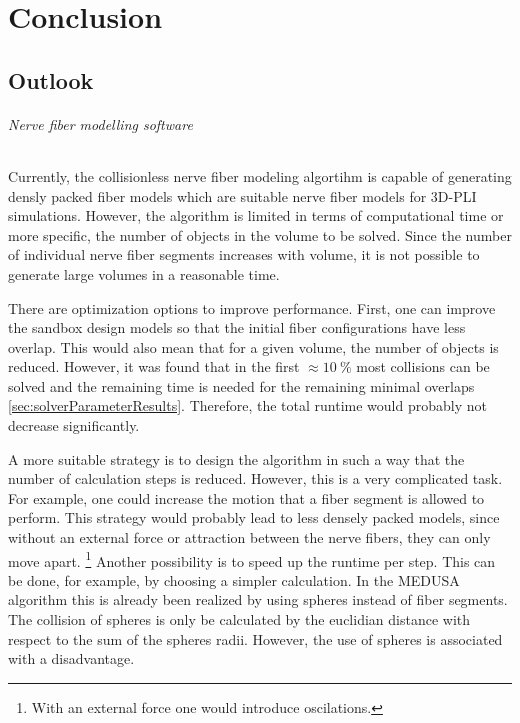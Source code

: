\newpage\null\thispagestyle{empty}\newpage
\clearpage{\thispagestyle{empty}\cleardoublepage}
\part{Conclusion}
% 
% 
% 
\setcounter{chapter}{9}
\chapter{Outlook}
\label{sec:outlook}
% 
\paragraph{Nerve fiber modelling software}
% 
Currently, the collisionless nerve fiber modeling algortihm is capable of generating densly packed fiber models which are suitable nerve fiber models for \ac{3D-PLI} simulations.
However, the algorithm is limited in terms of computational time or more specific, the number of objects in the volume to be solved.
Since the number of individual nerve fiber segments increases with volume, it is not possible to generate large volumes in a reasonable time.
\par
% 
There are optimization options to improve performance.
First, one can improve the sandbox design models so that the initial fiber configurations have less overlap.
This would also mean that for a given volume, the number of objects is reduced.
However, it was found that in the first $\approx \SI{10}{\percent}$ most collisions can be solved and the remaining time is needed for the remaining minimal overlaps \cref{sec:solverParameterResults}.
Therefore, the total runtime would probably not decrease significantly.
\par
% 
A more suitable strategy is to design the algorithm in such a way that the number of calculation steps is reduced.
However, this is a very complicated task.
For example, one could increase the motion that a fiber segment is allowed to perform.
This strategy would probably lead to less densely packed models, since without an external force or attraction between the nerve fibers, they can only move apart. \footnote{With an external force one would introduce oscilations.}
Another possibility is to speed up the runtime per step.
This can be done, for example, by choosing a simpler calculation.
In the \ac{MEDUSA} algorithm this is already been realized by using spheres instead of fiber segments.
The collision of spheres is only be calculated by the euclidian distance with respect to the sum of the spheres radii.
However, the use of spheres is associated with a disadvantage.
